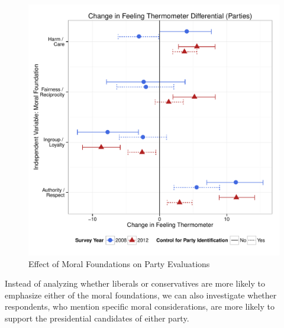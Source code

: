 \documentclass[12pt]{paper}
\begin{document}
\begin{figure}[ht]\centering
\includegraphics[scale=.6]{../calc/fig/m2f_vote.pdf}
\caption{Effect of Moral Foundations on Party Evaluations}\label{fig:m2g_vote}
\end{figure}

Instead of analyzing whether liberals or conservatives are more likely to emphasize either of the moral foundations, we can also investigate whether respondents, who mention specific moral considerations, are more likely to support the presidential candidates of either party. 
\end{document}
